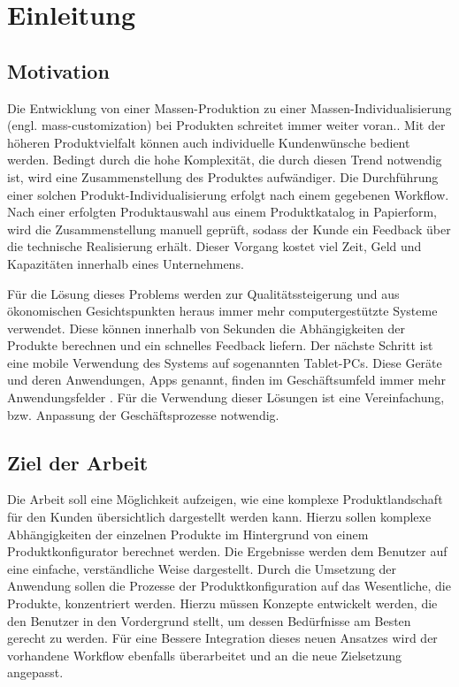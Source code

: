 \chapter{Einleitung}
\section{Motivation} \label{aufgaben}
Die Entwicklung von einer Massen-Produktion zu einer Massen-Individualisierung (engl. mass-customization) bei Produkten schreitet immer weiter voran.\cite{bib:massCustomization}. Mit der höheren Produktvielfalt können auch individuelle Kundenwünsche bedient werden. Bedingt durch die hohe Komplexität, die durch diesen Trend notwendig ist, wird eine Zusammenstellung des Produktes aufwändiger. Die Durchführung einer solchen Produkt-Individualisierung erfolgt nach einem gegebenen Workflow. Nach einer erfolgten Produktauswahl aus einem Produktkatalog in Papierform, wird die Zusammenstellung manuell geprüft, sodass der Kunde ein Feedback über die technische Realisierung erhält. Dieser Vorgang kostet viel Zeit, Geld und Kapazitäten innerhalb eines Unternehmens. \par

Für die Lösung dieses Problems werden zur Qualitätssteigerung und aus ökonomischen Gesichtspunkten heraus immer mehr computergestützte Systeme verwendet. Diese können innerhalb von Sekunden die Abhängigkeiten der Produkte berechnen und ein schnelles Feedback liefern. Der nächste Schritt ist eine mobile Verwendung des Systems auf sogenannten Tablet-PCs. Diese Geräte und deren Anwendungen, Apps genannt, finden im Geschäftsumfeld immer mehr Anwendungsfelder \cite{bib:businessApps}. Für die Verwendung dieser Lösungen ist eine Vereinfachung, bzw. Anpassung der Geschäftsprozesse notwendig.

\section{Ziel der Arbeit} \label{goal}
Die Arbeit soll eine Möglichkeit aufzeigen, wie eine komplexe Produktlandschaft für den Kunden übersichtlich dargestellt werden kann. Hierzu sollen komplexe Abhängigkeiten der einzelnen Produkte im Hintergrund von einem Produktkonfigurator berechnet werden. Die Ergebnisse werden dem Benutzer auf eine einfache, verständliche Weise dargestellt. Durch die Umsetzung der Anwendung sollen die Prozesse der Produktkonfiguration auf das Wesentliche, die Produkte, konzentriert werden. Hierzu müssen Konzepte entwickelt werden, die den Benutzer in den Vordergrund stellt, um dessen Bedürfnisse am Besten gerecht zu werden. Für eine Bessere Integration dieses neuen Ansatzes wird der vorhandene Workflow ebenfalls überarbeitet und an die neue Zielsetzung angepasst. \par

